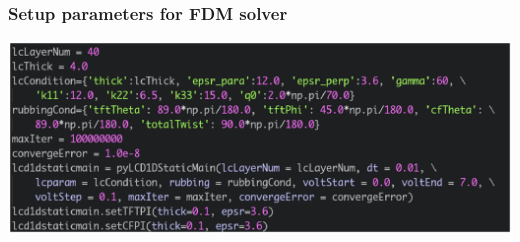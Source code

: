 \documentclass{beamer}
\begin{document}
\begin{frame}
\frametitle{Setup parameters for FDM solver}
\begin{center}
\includegraphics[scale=0.4]{setup_fdm.eps}
\end{center}
\end{frame}
\end{document}
